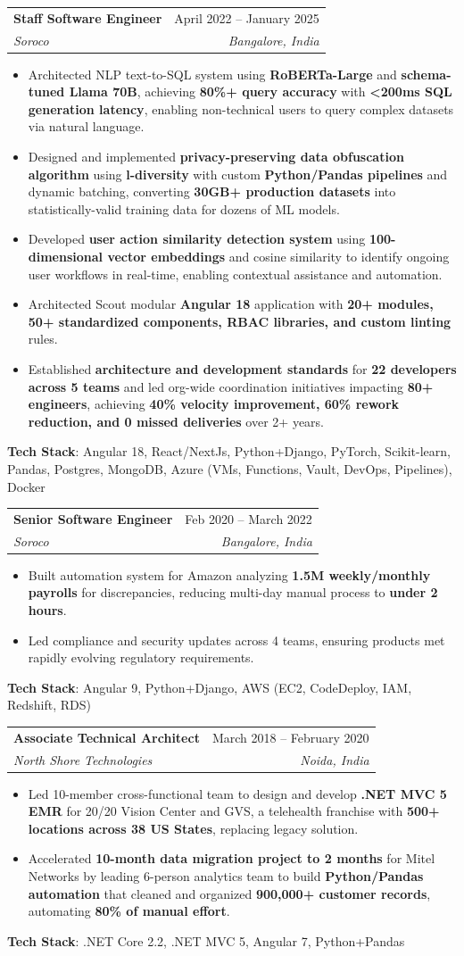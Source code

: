\documentclass[a4paper,11pt]{article}
\makeatletter
\newcommand{\resumeItem}[1]{
  \item\small{
    {#1 \vspace{-3pt}}
  }
}
\newcommand{\resumeSubheading}[4]{
  \vspace{-2pt}\item
    \begin{tabular*}{0.97\textwidth}[t]{l@{\extracolsep{\fill}}r}
      \textbf{#1} & #2 \\
      \textit{\small#3} & \textit{\small #4} \\
    \end{tabular*}\vspace{-7pt}
}
\newcommand{\resumeItemListStart}{\begin{itemize}}
\newcommand{\resumeItemListEnd}{\end{itemize}\vspace{-6pt}}
\makeatother
\begin{document}
\resumeSubheading {Staff Software Engineer}{April 2022 -- January 2025}{Soroco}{Bangalore, India}
\resumeItemListStart
\resumeItem{Architected NLP text-to-SQL system using \textbf{RoBERTa-Large} and \textbf{schema-tuned Llama 70B}, achieving \textbf{80\%+ query accuracy} with \textbf{<200ms SQL generation latency}, enabling non-technical users to query complex datasets via natural language.}
\resumeItem{Designed and implemented \textbf{privacy-preserving data obfuscation algorithm} using \textbf{l-diversity} with custom \textbf{Python/Pandas pipelines} and dynamic batching, converting \textbf{30GB+ production datasets} into statistically-valid training data for dozens of ML models.}
\resumeItem{Developed \textbf{user action similarity detection system} using \textbf{100-dimensional vector embeddings} and cosine similarity to identify ongoing user workflows in real-time, enabling contextual assistance and automation.}
\resumeItem{Architected Scout modular \textbf{Angular 18} application with \textbf{20+ modules, 50+ standardized components, RBAC libraries, and custom linting} rules.}
\resumeItem{Established \textbf{architecture and development standards} for \textbf{22 developers across 5 teams} and led org-wide coordination initiatives impacting \textbf{80+ engineers}, achieving \textbf{40\% velocity improvement, 60\% rework reduction, and 0 missed deliveries} over 2+ years.}
\resumeItemListEnd
\textbf{Tech Stack}: Angular 18, React/NextJs, Python+Django, PyTorch, Scikit-learn, Pandas, Postgres, MongoDB, Azure (VMs, Functions, Vault, DevOps, Pipelines), Docker

\resumeSubheading{Senior Software Engineer}{Feb 2020 -- March 2022}{Soroco}{Bangalore, India}
\resumeItemListStart
\resumeItem{Built automation system for Amazon analyzing \textbf{1.5M weekly/monthly payrolls} for discrepancies, reducing multi-day manual process to \textbf{under 2 hours}.}
\resumeItem{Led compliance and security updates across 4 teams, ensuring products met rapidly evolving regulatory requirements.}
\resumeItemListEnd
\textbf{Tech Stack}: Angular 9, Python+Django, AWS (EC2, CodeDeploy, IAM, Redshift, RDS)

\resumeSubheading{Associate Technical Architect}{March 2018 -- February 2020}{North Shore Technologies}{Noida, India}
\resumeItemListStart
\resumeItem{Led 10-member cross-functional team to design and develop \textbf{.NET MVC 5 EMR} for 20/20 Vision Center and GVS, a telehealth franchise with \textbf{500+ locations across 38 US States}, replacing legacy solution.}
\resumeItem{Accelerated \textbf{10-month data migration project to 2 months} for Mitel Networks by leading 6-person analytics team to build \textbf{Python/Pandas automation} that cleaned and organized \textbf{900,000+ customer records}, automating \textbf{80\% of manual effort}.}
\resumeItemListEnd
\textbf{Tech Stack}: .NET Core 2.2, .NET MVC 5, Angular 7, Python+Pandas
\end{document}
